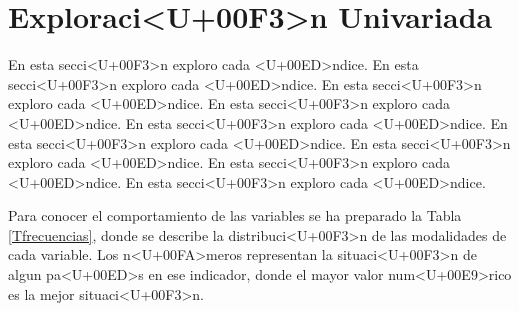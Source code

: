 \documentclass{article}
\begin{document}
\section{Exploraci<U+00F3>n Univariada}\label{univariada}

En esta secci<U+00F3>n exploro cada <U+00ED>ndice. En esta secci<U+00F3>n exploro cada <U+00ED>ndice. En esta secci<U+00F3>n exploro cada <U+00ED>ndice. En esta secci<U+00F3>n exploro cada <U+00ED>ndice. En esta secci<U+00F3>n exploro cada <U+00ED>ndice. En esta secci<U+00F3>n exploro cada <U+00ED>ndice. En esta secci<U+00F3>n exploro cada <U+00ED>ndice. En esta secci<U+00F3>n exploro cada <U+00ED>ndice. En esta secci<U+00F3>n exploro cada <U+00ED>ndice.





Para conocer el comportamiento de las variables se ha preparado la Tabla \ref{Tfrecuencias}, donde se describe la distribuci<U+00F3>n de las modalidades de cada variable. Los n<U+00FA>meros representan la situaci<U+00F3>n de algun pa<U+00ED>s en ese indicador, donde el mayor valor num<U+00E9>rico es la mejor situaci<U+00F3>n.
\end{document}
